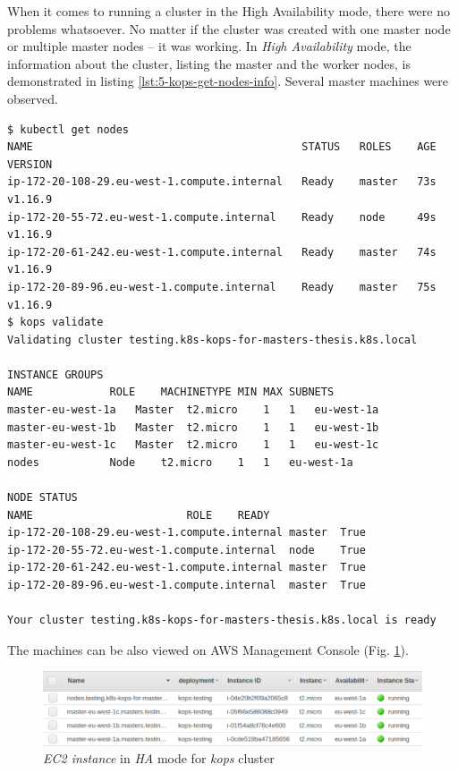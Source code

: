 When it comes to running a cluster in the High Availability mode, there were no problems whatsoever. No matter if the cluster was created with one master node or multiple master nodes -- it was working. In \textit{High Availability} mode, the information about the cluster, listing the master and the worker nodes, is demonstrated in listing \ref{lst:5-kops-get-nodes-info}. Several master machines were observed.
\begin{lstlisting}[basicstyle=\scriptsize,xleftmargin=0cm,label=lst:5-kops-get-nodes-info,caption={Getting information about the cluster}]
$ kubectl get nodes
NAME                                          STATUS   ROLES    AGE   VERSION
ip-172-20-108-29.eu-west-1.compute.internal   Ready    master   73s   v1.16.9
ip-172-20-55-72.eu-west-1.compute.internal    Ready    node     49s   v1.16.9
ip-172-20-61-242.eu-west-1.compute.internal   Ready    master   74s   v1.16.9
ip-172-20-89-96.eu-west-1.compute.internal    Ready    master   75s   v1.16.9
$ kops validate
Validating cluster testing.k8s-kops-for-masters-thesis.k8s.local

INSTANCE GROUPS
NAME			ROLE	MACHINETYPE	MIN	MAX	SUBNETS
master-eu-west-1a	Master	t2.micro	1	1	eu-west-1a
master-eu-west-1b	Master	t2.micro	1	1	eu-west-1b
master-eu-west-1c	Master	t2.micro	1	1	eu-west-1c
nodes			Node	t2.micro	1	1	eu-west-1a

NODE STATUS
NAME						ROLE	READY
ip-172-20-108-29.eu-west-1.compute.internal	master	True
ip-172-20-55-72.eu-west-1.compute.internal	node	True
ip-172-20-61-242.eu-west-1.compute.internal	master	True
ip-172-20-89-96.eu-west-1.compute.internal	master	True

Your cluster testing.k8s-kops-for-masters-thesis.k8s.local is ready
\end{lstlisting}

The machines can be also viewed on AWS Management Console (Fig. \ref{fig:k8s-kops-ha-aws}).
\begin{figure}[H]
    \centering
    \includegraphics[width=16cm]{figures/k8s-kops-ha-aws-small.png}
    \captionsetup{justification=centering,margin=2cm}
    \caption{\textit{EC2 instance} in \textit{HA} mode for \textit{kops} cluster}
    \label{fig:k8s-kops-ha-aws}
\end{figure}

